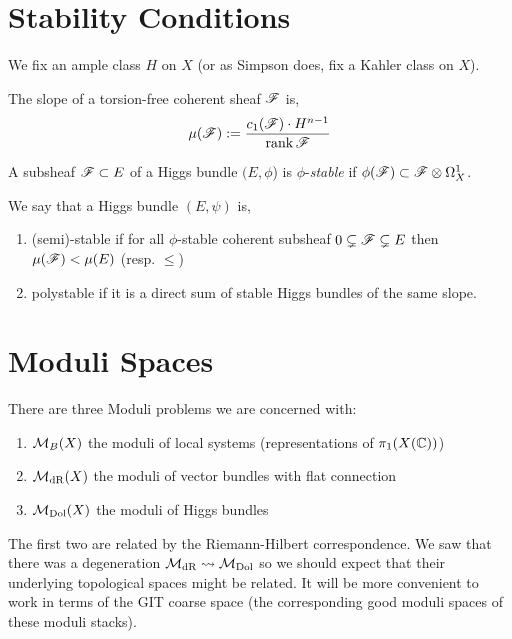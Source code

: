 \documentclass[12pt]{article}
\begin{document}
\section{Stability Conditions}

We fix an ample class $H$ on $X$ (or as Simpson does, fix a Kahler class on $X$).

\begin{defn}
The slope of a torsion-free coherent sheaf $\mathscr{F}$ is,
\[ \mu(\mathscr{F}) := \frac{c_1(\mathscr{F}) \cdot H^{n-1}}{\operatorname{\mathrm{rank}}{\mathscr{F}}} \]
\end{defn}

\begin{defn}
A subsheaf $\mathscr{F} \subset E$ of a Higgs bundle $(E, \phi$) is $\phi$-\textit{stable} if $\phi(\mathscr{F}) \subset \mathscr{F} \otimes \Omega^1_X$.
\end{defn}

\begin{defn}
We say that a Higgs bundle $(E, \psi)$ is,
\begin{enumerate}
\item (semi)-stable if for all $\phi$-stable coherent subsheaf $0 \subsetneq \mathscr{F} \subsetneq E$ then $\mu(\mathscr{F}) < \mu(E)$ (resp. $\le$)
\item polystable if it is a direct sum of stable Higgs bundles of the same slope.
\end{enumerate}
\end{defn}

\section{Moduli Spaces}

\newcommand{\Dol}{\mathrm{Dol}}

There are three Moduli problems we are concerned with:
\begin{enumerate}
\item  $\mathcal{M}_B(X)$ the moduli of local systems (representations of $\pi_1(X(\mathbb{C}))$)
\item $\mathcal{M}_{\mathrm{dR}}(X)$ the moduli of vector bundles with flat connection
\item $\M_{\Dol}(X)$ the moduli of Higgs bundles 
\end{enumerate}

The first two are related by the Riemann-Hilbert correspondence. We saw that there was a degeneration $\M_{\dR} \spto \M_{\Dol}$ so we should expect that their underlying topological spaces might be related. It will be more convenient to work in terms of the GIT coarse space (the corresponding good moduli spaces of these moduli stacks). 
\end{document}
